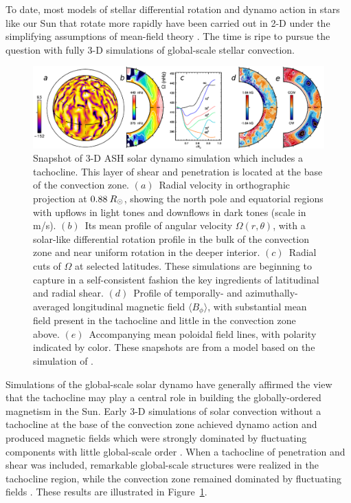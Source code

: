 To date, most models of stellar differential rotation and dynamo
action in stars like our Sun that rotate more rapidly have been
carried out in 2-D under the simplifying assumptions of mean-field
theory \citep[e.g.,][]{Rudiger_et_al_1998, Kuker&Stix_2001,
Kuker&Rudiger_2005_A&A, Kuker&Rudiger_2005_AN}.  The 
time is ripe to pursue the question with fully 3-D simulations of
global-scale stellar convection.


\begin{figure}[!t]
  \begin{center}
    \includegraphics[width=\linewidth]{figs/chapter_1/matt_pen6_Vr_DR_Bphi_Bp.eps}
  \end{center}
    \caption[Snapshot of 3-D ASH solar dynamo simulation which includes a tachocline]
            {Snapshot of 3-D ASH solar dynamo simulation which
              includes a tachocline.  This layer of shear and
              penetration is located at the base  of the convection zone. 
      $(a)$~Radial velocity in orthographic
      projection at $0.88\:R_\odot$, showing the north pole and equatorial
      regions with upflows in light tones and downflows in dark tones (scale in m/s).
      $(b)$~Its mean profile of angular velocity
      $\Omega(r,\theta)$, with a solar-like differential rotation profile
      in the bulk of the convection zone and near uniform rotation in the
      deeper interior. $(c)$~Radial cuts of $\Omega$ at selected
      latitudes.  These simulations are beginning to capture in a
      self-consistent fashion the key ingredients of latitudinal and radial
      shear.
      $(d)$~Profile of temporally- and azimuthally-averaged longitudinal
      magnetic field $\langle B_\phi \rangle$,  
      with substantial mean field present in the
      tachocline and little in the convection zone above.
      $(e)$~Accompanying mean poloidal field lines, with polarity
      indicated by color.  These snapshots are from a model based on
      the simulation of \cite{Browning_et_al_2006}.
      \label{fig:Browning et al tachocline}}
\end{figure}

Simulations of the global-scale solar dynamo have generally affirmed
the view that the tachocline may play a central role in building the
globally-ordered magnetism in the Sun.  Early 3-D
simulations of solar convection without a tachocline
at the base of the convection zone achieved dynamo action and produced
magnetic fields which were strongly dominated by fluctuating
components with little global-scale order \citep{Brun_et_al_2004}.
When a tachocline of penetration and shear was included, remarkable
global-scale structures were realized in the tachocline region, while
the convection zone remained dominated by fluctuating fields
\citep{Browning_et_al_2006}.  These results are illustrated in
Figure~\ref{fig:Browning et al tachocline}.  


